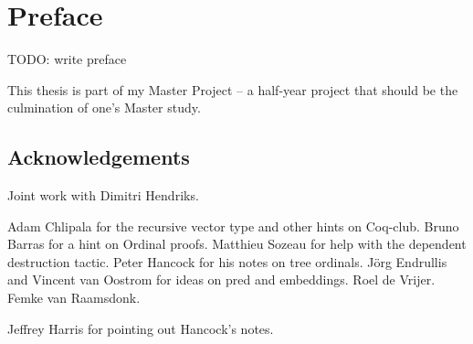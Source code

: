 \chapter*{Preface}
\thispagestyle{empty}

TODO: write preface

This thesis is part of my Master Project -- a half-year project that should be
the culmination of one's Master study.


\section*{Acknowledgements}

Joint work with Dimitri Hendriks.

Adam Chlipala for the recursive vector type and other hints on
Coq-club. Bruno Barras for a hint on Ordinal proofs. Matthieu Sozeau for help
with the dependent destruction tactic. Peter Hancock for his notes on tree
ordinals. J\"org Endrullis and Vincent van Oostrom for ideas on pred and
embeddings. Roel de Vrijer. Femke van Raamsdonk.

Jeffrey Harris for pointing out Hancock's notes.
